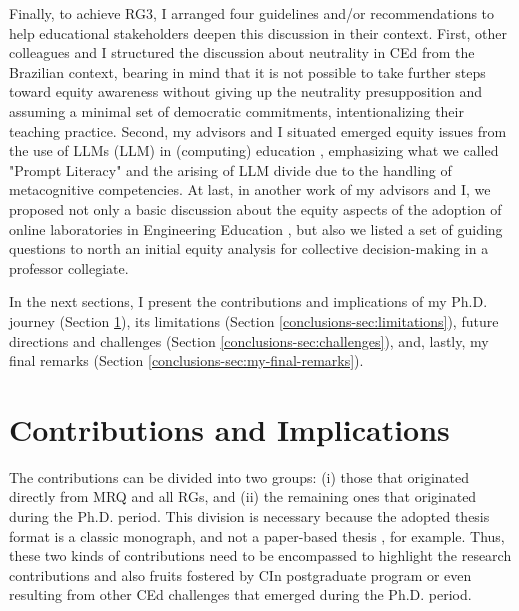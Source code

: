  Finally, to achieve \gls{RG}3, I arranged four guidelines and/or recommendations to help educational stakeholders deepen this discussion in their context. First, other colleagues and I structured the discussion about neutrality in \acrfull{CEd} \cite{bispojr:2022-educomp} from the Brazilian context, bearing in mind that it is not possible to take further steps toward equity awareness without giving up the neutrality presupposition and assuming a minimal set of democratic commitments, intentionalizing their teaching practice. Second, my advisors and I situated emerged equity issues from the use of \acrlong{LLM}s (\acrshort{LLM}) in (computing) education \cite{bispojr:2024-nmp}, emphasizing what we called "Prompt Literacy" and the arising of \gls{LLM} divide due to the handling of metacognitive competencies. At last, in another work of my advisors and I, we proposed not only a basic discussion about the equity aspects of the adoption of online laboratories in Engineering Education \cite{bispojr:2024-online-lab}, but also we listed a set of guiding questions to north an initial equity analysis for collective decision-making in a professor collegiate. %

 In the next sections, I present the contributions and implications of my \gls{Ph.D.} journey (Section \ref{conclusions-sec:contrib-impl}), its limitations (Section \ref{conclusions-sec:limitations}), future directions and challenges (Section \ref{conclusions-sec:challenges}), and, lastly, my final remarks (Section \ref{conclusions-sec:my-final-remarks}).

 \section{Contributions and Implications}
 \label{conclusions-sec:contrib-impl}

The contributions can be divided into two groups: (i) those that originated directly from \gls{MRQ} and all \glspl{RG}, and (ii) the remaining ones that originated during the \gls{Ph.D.} period. This division is necessary because the adopted thesis format is a classic monograph, and not a paper-based thesis \cite{kubota:2021}, for example. Thus, these two kinds of contributions need to be encompassed to highlight the research contributions and also fruits fostered by \acrfull{CIn} postgraduate program or even resulting from other \gls{CEd} challenges that emerged during the \gls{Ph.D.} period.

